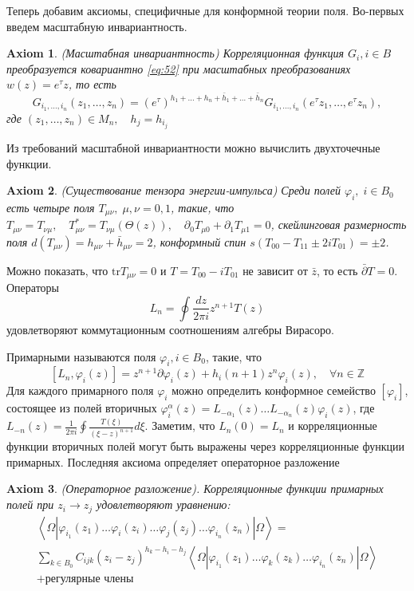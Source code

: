 \documentclass[12pt]{article}
\newtheorem{axiom}{Axiom}
\begin{document}
Теперь добавим аксиомы, специфичные для конформной теории поля. Во-первых введем масштабную
инвариантность.
\begin{axiom}
  (Масштабная инвариантность) Корреляционная функция $G_{i}, i\in B$ преобразуется ковариантно
  \eqref{eq:52} при масштабных преобразованиях $w(z)=e^{\tau}z$, то есть
  \begin{equation}
    \label{eq:58}
    G_{i_{1},\dots,i_{n}}(z_{1},\dots,z_{n})=\left(e^{\tau}\right)^{h_{1}+\dots+h_{n}+\bar{h}_{1}+\dots+\bar{h}_{n}} 
    G_{i_{1},\dots,i_{n}}(e^{\tau} z_{1},\dots,e^{\tau} z_{n}),
  \end{equation}
  где $(z_{1},\dots,z_{n})\in M_{n},\quad h_{j}=h_{i_{j}}$
\end{axiom}
Из требований масштабной инвариантности можно вычислить двухточечные функции. 
\begin{axiom}
  (Существование тензора энергии-импульса) Среди полей $\varphi_{i},\; i\in B_{0}$ есть четыре поля
  $T_{\mu\nu},\; \mu,\nu=0,1$, такие, что $T_{\mu\nu}=T_{\nu\mu},\quad
  T_{\mu\nu}^{*}=T_{\nu\mu}(\Theta(z)),\quad \partial_{0} T_{\mu 0}+\partial_{1}T_{\mu 1}=0$,
  скейлинговая размерность поля $d(T_{\mu\nu})=h_{\mu\nu}+\bar{h}_{\mu\nu}=2$, конформный спин
  $s(T_{00}-T_{11}\pm 2i T_{01})=\pm 2$.
\end{axiom}
Можно показать, что $\mathrm{tr} T_{\mu\nu}=0$ и $T=T_{00}-i T_{01}$ не зависит от $\bar z$, то есть
$\bar \partial T=0$. Операторы
\begin{equation}
  \label{eq:59}
    L_{n}=\oint \frac{dz}{2\pi i} z^{n+1} T(z)
\end{equation}
удовлетворяют коммутационным соотношениям алгебры Вирасоро. 

Примарными называются поля $\varphi_{i}, i\in B_{0}$, такие, что
\begin{equation}
  \label{eq:60}
  [L_{n}, \varphi_{i}(z)]=z^{n+1}\partial \varphi_{i}(z)+h_{i}(n+1)z^{n}\varphi_{i}(z),\quad \forall n\in\mathbb{Z}
\end{equation}
Для каждого примарного поля $\varphi_{i}$ можно определить конформное семейство $[\varphi_{i}]$,
состоящее из полей вторичных $\varphi_{i}^{\alpha}(z)=L_{-\alpha_{1}}(z)\dots
L_{-\alpha_{n}}(z)\varphi_{i}(z)$, где $L_{-n}(z)=\frac{1}{2\pi i}\oint\frac{T(\xi)}{(\xi-z)^{n+1}}
d\xi$. Заметим, что $L_{n}(0)=L_{n}$ и корреляционные функции вторичных полей могут быть выражены
через корреляционные функции примарных. Последняя аксиома определяет операторное разложение
\begin{axiom}
  (Операторное разложение). Корреляционные функции примарных полей при $z_{i}\to z_{j}$
  удовлетворяют уравнению:
\begin{multline}
  \label{eq:61}
  \left<\Omega|\varphi_{i_{1}}(z_{1})\dots\varphi_{i}(z_{i})\dots \varphi_{j}(z_{j})\dots \varphi_{i_{n}}(z_{n})|\Omega\right>=\\
  \sum_{k\in B_{0}}C_{ijk} (z_{i}-z_{j})^{h_{k}-h_{i}-h_{j}} \left<\Omega|\varphi_{i_{1}}(z_{1})\dots\varphi_{k}(z_{k})\dots \varphi_{i_{n}}(z_{n})|\Omega\right>\\
  +\mbox{регулярные члены}
\end{multline}

\end{axiom}
\end{document}
